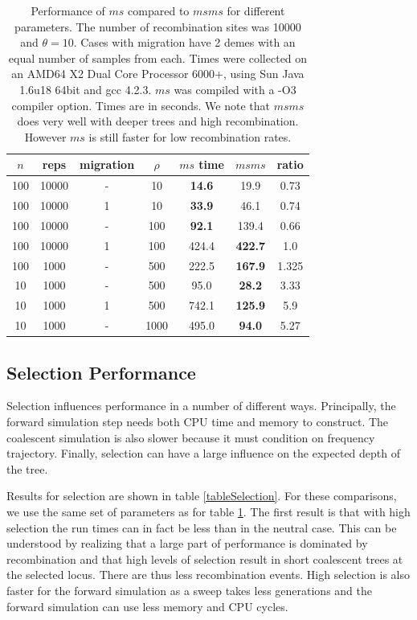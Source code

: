 \documentclass{article}
\begin{document}
\begin{table}[htp]
\begin{center}
\begin{tabular}{|c c c c| c c| c|}
\hline
$n$ & reps & migration & $\rho$ & $ms$ time & $msms$ & ratio \\
\hline \hline
100 & 10000 & - & 10 & {\bf 14.6} & 19.9 & 0.73 \\
100 & 10000 & 1 & 10 & {\bf 33.9} & 46.1 & 0.74 \\
100 & 10000 & - & 100 & {\bf 92.1} & 139.4 & 0.66 \\
100 & 10000 & 1 & 100 & 424.4 & {\bf 422.7} & 1.0\\
\hline\hline
100 & 1000 & - & 500 & 222.5 & {\bf 167.9} & 1.325 \\
10 & 1000 & - & 500 & 95.0 & {\bf 28.2} & 3.33 \\
10 & 1000 & 1 & 500 & 742.1 & {\bf 125.9} & 5.9 \\
10 & 1000 & - & 1000 & 495.0 & {\bf 94.0} & 5.27 \\
\hline
\end{tabular}
\end{center}
\caption{Performance of $ms$ compared to $msms$ for different parameters. The
number of recombination sites was 10000 and $\theta=10$. Cases with migration
have 2 demes with an equal number of samples from each. Times were collected on
an AMD64 X2 Dual Core Processor 6000+, using Sun Java 1.6u18 64bit and gcc
4.2.3. $ms$ was compiled with a -O3 compiler option. Times are in seconds. We
note that $msms$ does very well with deeper trees and high recombination. However $ms$ is still faster for low 
recombination rates. } 
\label{tableMSvrsMSMS} 
\end{table}

\subsection{Selection Performance}

Selection influences performance in a number of different ways. Principally, the
forward simulation step needs both CPU time and memory to construct. The
coalescent simulation is also slower because it must condition on frequency
trajectory. Finally, selection can have a large influence on the expected depth of the tree.

Results for selection are shown in table \ref{tableSelection}. For these
comparisons, we use the same set of parameters as for table \ref{tableMSvrsMSMS}.
The first result is that with high selection the run times can in fact be less
than in the neutral case. This can be understood by realizing that a large part
of performance is dominated by recombination and that high levels of selection
result in short coalescent trees at the selected locus. There are thus less
recombination events. High selection is also faster for the forward simulation as
a sweep takes less generations and the forward simulation can use less memory and
CPU cycles.
\end{document}
